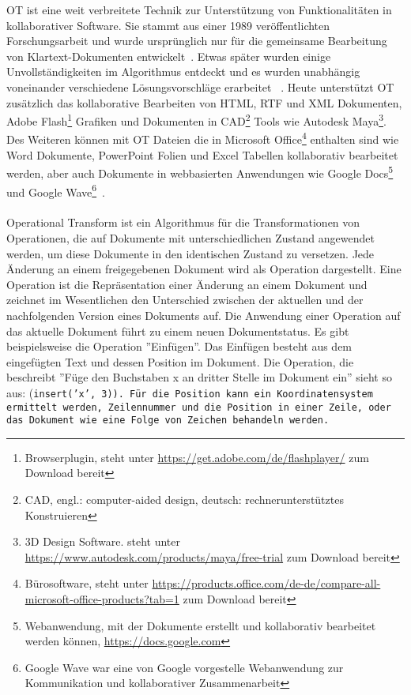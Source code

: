 \gls{OT} ist eine weit verbreitete Technik zur Unterstützung von Funktionalitäten in \gls{kollaborativ}er Software.
Sie stammt aus einer 1989 veröffentlichten Forschungsarbeit und wurde ursprünglich nur für die gemeinsame Bearbeitung von Klartext-Dokumenten entwickelt~\cite{ot_paper}. Etwas später wurden einige Unvollständigkeiten im Algorithmus entdeckt und es wurden unabhängig voneinander verschiedene Lösungsvorschläge erarbeitet ~\cite{ot-later}.
Heute unterstützt \gls{OT} zusätzlich das \gls{kollaborativ}e Bearbeiten von \gls{HTML}, RTF und XML Dokumenten, Adobe Flash\footnote{ Browserplugin, steht unter \url{https://get.adobe.com/de/flashplayer/} zum Download bereit} Grafiken und Dokumenten in CAD\footnote{ CAD, engl.: computer-aided design, deutsch: rechnerunterstütztes Konstruieren} Tools wie Autodesk Maya\footnote{ 3D Design Software. steht unter \url{https://www.autodesk.com/products/maya/free-trial} zum Download bereit}.
Des Weiteren können mit \gls{OT} Dateien die in Microsoft Office\footnote{ Bürosoftware, steht unter \url{https://products.office.com/de-de/compare-all-microsoft-office-products?tab=1} zum Download bereit} enthalten sind wie Word Dokumente, PowerPoint Folien und Excel Tabellen kollaborativ bearbeitet werden, aber auch Dokumente in webbasierten Anwendungen wie Google Docs\footnote{ Webanwendung, mit der Dokumente erstellt und kollaborativ bearbeitet werden können, \url{https://docs.google.com}} und Google Wave\footnote{ Google Wave war eine von Google vorgestelle Webanwendung zur Kommunikation und kollaborativer Zusammenarbeit}~\cite{ot-faq}.\\\\
%
%
Operational Transform ist ein Algorithmus für die Transformationen von Operationen, die auf Dokumente mit unterschiedlichen Zustand angewendet werden, um diese Dokumente in den identischen Zustand zu versetzen.
Jede Änderung an einem freigegebenen Dokument wird als Operation dargestellt.
Eine Operation ist die Repräsentation einer Änderung an einem Dokument und zeichnet im Wesentlichen den Unterschied zwischen der aktuellen und der nachfolgenden Version eines Dokuments auf.
Die Anwendung einer Operation auf das aktuelle Dokument führt zu einem neuen Dokumentstatus.
Es gibt beispielsweise die Operation ''Einfügen''. 
Das Einfügen besteht aus dem eingefügten Text und dessen Position im Dokument. Die Operation, die beschreibt ''Füge den Buchstaben x an dritter Stelle im Dokument ein'' sieht so aus: (\tt{insert('x', 3)}).
Für die Position kann ein Koordinatensystem ermittelt werden, Zeilennummer und die Position in einer Zeile, oder das Dokument wie eine Folge von Zeichen behandeln werden.\\
